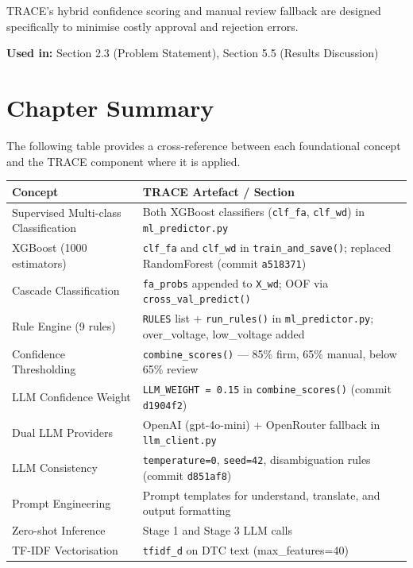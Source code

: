 \documentclass[10pt]{article}
\begin{document}
TRACE's hybrid confidence scoring and manual review fallback are designed specifically to minimise costly approval and rejection errors.

\textbf{Used in:} Section 2.3 (Problem Statement), Section 5.5 (Results Discussion)

\section{Chapter Summary}

The following table provides a cross-reference between each foundational concept and the TRACE component where it is applied.

\begin{table}[h!]
\centering
\begin{tabular}{|p{6cm}|p{8cm}|}
\hline
\textbf{Concept} & \textbf{TRACE Artefact / Section} \\ \hline
Supervised Multi-class Classification & Both XGBoost classifiers (\texttt{clf\_fa}, \texttt{clf\_wd}) in \texttt{ml\_predictor.py} \\ \hline
XGBoost (1000 estimators) & \texttt{clf\_fa} and \texttt{clf\_wd} in \texttt{train\_and\_save()}; replaced RandomForest (commit \texttt{a518371}) \\ \hline
Cascade Classification & \texttt{fa\_probs} appended to \texttt{X\_wd}; OOF via \texttt{cross\_val\_predict()} \\ \hline
Rule Engine (9 rules) & \texttt{RULES} list + \texttt{run\_rules()} in \texttt{ml\_predictor.py}; over\_voltage, low\_voltage added \\ \hline
Confidence Thresholding & \texttt{combine\_scores()} --- 85\% firm, 65\% manual, below 65\% review \\ \hline
LLM Confidence Weight & \texttt{LLM\_WEIGHT = 0.15} in \texttt{combine\_scores()} (commit \texttt{d1904f2}) \\ \hline
Dual LLM Providers & OpenAI (gpt-4o-mini) + OpenRouter fallback in \texttt{llm\_client.py} \\ \hline
LLM Consistency & \texttt{temperature=0}, \texttt{seed=42}, disambiguation rules (commit \texttt{d851af8}) \\ \hline
Prompt Engineering & Prompt templates for understand, translate, and output formatting \\ \hline
Zero-shot Inference & Stage 1 and Stage 3 LLM calls \\ \hline
TF-IDF Vectorisation & \texttt{tfidf\_d} on DTC text (max\_features=40) \\ \hline

\end{tabular}
\end{table}
\end{document}
